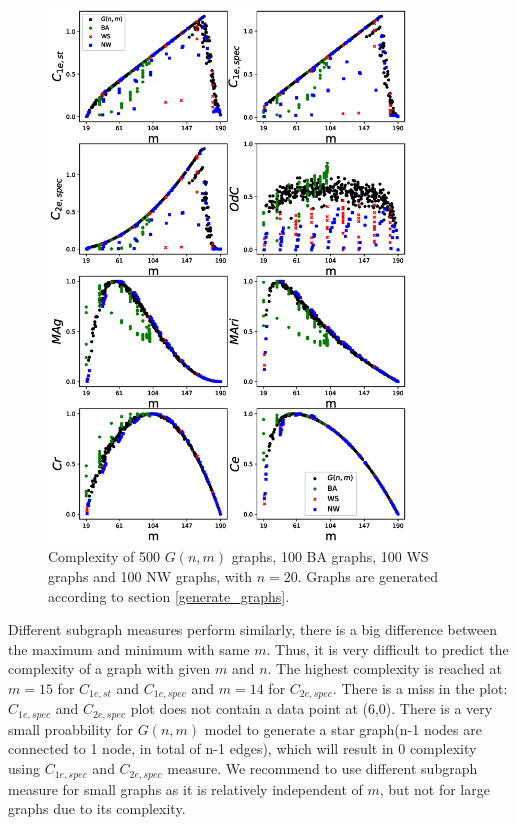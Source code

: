 \documentclass[12pt]{article}
\begin{document}
\newpage
\begin{figure}[p!]
    \centering
    \vspace*{-2in}
    \includegraphics[width = 0.85\textwidth]{complexities_sp.eps}
    \vspace*{-0.8in}
    \caption{Complexity of 500 $G(n,m)$ graphs, 100 BA graphs, 100 WS graphs and 100 NW graphs, with $n=20$. Graphs are generated according to section \ref{generate_graphs}.}
    \label{fig:graph_models}
\end{figure}
Different subgraph measures perform similarly, there is a big difference between the maximum and minimum with same $m$. Thus, it is very difficult to predict the complexity of a graph with given $m$ and $n$. The highest complexity is reached at $m=15$ for $C_{1e,st}$ and $C_{1e,spec}$ and $m=14$ for $C_{2e,spec}$. There is a miss in the plot: $C_{1e,spec}$ and $C_{2e,spec}$ plot does not contain a data point at (6,0). There is a very small proabbility for $G(n,m)$ model to generate a star graph(n-1 nodes are connected to 1 node, in total of n-1 edges), which will result in 0 complexity using $C_{1e,spec}$ and $C_{2e,spec}$ measure. We recommend to use different subgraph measure for small graphs as it is relatively independent of $m$, but not for large graphs due to its complexity.\\
\end{document}
